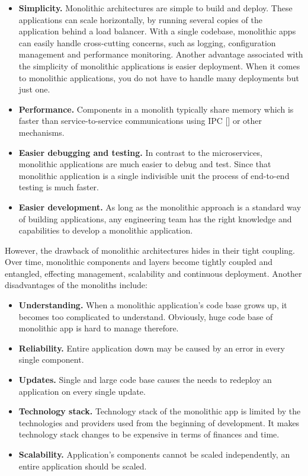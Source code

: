\begin{itemize}
    \item \textbf{Simplicity.} Monolithic architectures are simple to build and deploy.
    These applications can scale horizontally, by running several copies of the application behind a load balancer.
    With a single codebase, monolithic apps can easily handle cross-cutting concerns, such as logging,
    configuration management and performance monitoring.
    Another advantage associated with the simplicity of monolithic applications is easier deployment.
    When it comes to monolithic applications, you do not have to handle many deployments but just one.
    \item \textbf{Performance.} Components in a monolith typically share memory which is faster than service-to-service
    communications using IPC [\cite{proctor1999linux}] or other mechanisms.
    \item \textbf{Easier debugging and testing.}
    In contrast to the microservices, monolithic applications are much easier to debug and test.
    Since that monolithic application is a single indivisible unit the process of end-to-end testing is much faster.
    \item \textbf{Easier development.} As long as the monolithic approach is a standard way of building applications,
    any engineering team has the right knowledge and capabilities to develop a monolithic application.
\end{itemize}

However, the drawback of monolithic architectures hides in their tight coupling.
Over time, monolithic components and layers become tightly coupled and entangled, effecting management, scalability
and continuous deployment.
Another disadvantages of the monoliths include:
\begin{itemize}
    \item \textbf{Understanding.} When a monolithic application's code base grows up, it becomes too complicated to understand.
    Obviously, huge code base of monolithic app is hard to manage therefore.
    \item \textbf{Reliability.} Entire application down may be caused by an error in every single component.
    \item \textbf{Updates.} Single and large code base causes the needs to redeploy an application on every single update.
    \item \textbf{Technology stack.} Technology stack of the monolithic app is limited by the technologies and providers
    used from the beginning of development.
    It makes technology stack changes to be expensive in terms of finances and time.
    \item \textbf{Scalability.} Application's components cannot be scaled independently, an entire application should be scaled.
\end{itemize}

